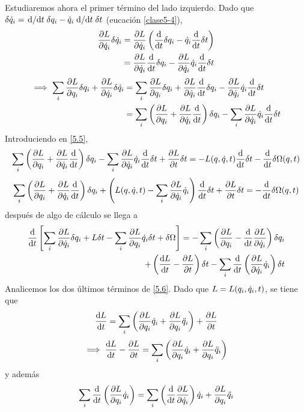 Estudiaremos ahora el primer término del lado izquierdo. Dado que $\delta\dot{q}_i=\dv*{t}\delta q_i-\dot{q}_i\dv*{t}\delta t$ (eucación \eqref{clase5-4}),
\begin{align}
  \pdv{L}{\dot{q}_i}\delta \dot{q}_i&=\pdv{L}{\dot{q}_i}\left(\dv{t}\delta q_i-\dot{q}_i\dv{t}\delta t\right)\\
  &=\pdv{L}{\dot{q}_i}\dv{t}\delta q_i-\pdv{L}{\dot{q}_i}\dot{q}_i\dv{t}\delta t
\end{align}
\begin{align}
  \implies \sum_i\pdv{L}{q_i}\delta q_i+\pdv{L}{\dot{q}_i}\delta \dot{q}_i&=\sum_i\pdv{L}{q_i}\delta q_i+\pdv{L}{\dot{q}_i}\dv{t}\delta q_i-\pdv{L}{\dot{q}_i}\dot{q}_i\dv{t}\delta t\\
  &=\sum_i\left(\pdv{L}{q_i}+\pdv{L}{\dot{q}_i}\dv{t}\right)\delta q_i-\sum_i\pdv{L}{\dot{q}_i}\dot{q}_i\dv{t}\delta t
\end{align}
Introduciendo en \eqref{5.5},
\begin{equation}
  \sum_i\left(\pdv{L}{q_i}+\pdv{L}{\dot{q}_i}\dv{t}\right)\delta q_i-\sum_i\pdv{L}{\dot{q}_i}\dot{q}_i\dv{t}\delta t+\pdv{L}{t}\delta t=-L(q,\dot{q},t)\dv{t}\delta t-\dv{t}\delta \Omega(q,t)
 \end{equation}
 \begin{equation}
  \sum_i\left(\pdv{L}{q_i}+\pdv{L}{\dot{q}_i}\dv{t}\right)\delta q_i+\left(L(q,\dot{q},t)-\sum_i\pdv{L}{\dot{q}_i}\dot{q}_i\right)\dv{t}\delta t+\pdv{L}{t}\delta t=-\dv{t}\delta \Omega(q,t)
\end{equation}
después de algo de cálculo se llega a 
\begin{equation}\label{5.6}
\begin{split}
  \dv{t}\left[\sum_i\pdv{L}{\dot{q}_i}\delta q_i+L\delta t-\sum_i\pdv{L}{q_i}\dot{q}_i\delta t+\delta \Omega\right]=-\sum_i\left(\pdv{L}{q_i}-\dv{t}\pdv{L}{\dot{q}_i}\right)\delta q_i \\ +\left(\dv{L}{t}-\pdv{L}{t}\right)\delta t-\sum_i\dv{t}\left(\pdv{L}{\dot{q}_i}\dot{q}_i\right)\delta t
 \end{split}
\end{equation}
Analicemos los dos últimos términos de \eqref{5.6}. Dado que $L=L(q_i,\dot{q}_i,t)$, se tiene que
\begin{equation}
  \dv{L}{t}=\sum_i\left(\pdv{L}{q_i}\dot{q}_i+\pdv{L}{q_i}\ddot{q}_i\right)+\pdv{L}{t}
\end{equation}
\begin{equation}
  \implies \dv{L}{t}-\pdv{L}{t}=\sum_i\left(\pdv{L}{q_i}\dot{q}_i+\pdv{L}{q_i}\ddot{q}_i\right)
\end{equation}
y además
\begin{equation}
  \sum_i\dv{t}\left(\pdv{L}{q_i}\dot{q}_i\right)=\sum_i\left(\dv{t}\pdv{L}{\dot{q}_i}\right)\dot{q}_i+\pdv{L}{q_i}\ddot{q}_i
\end{equation}
